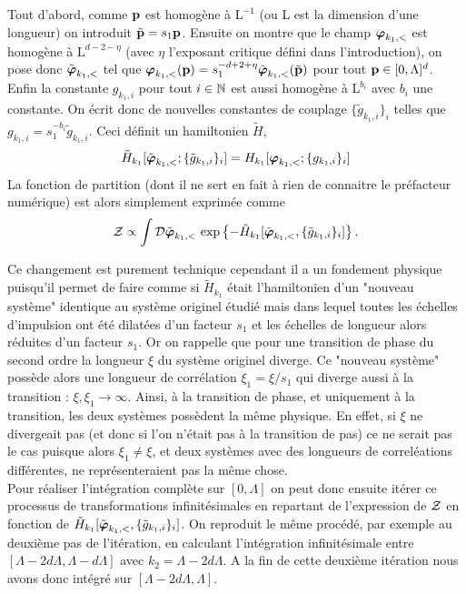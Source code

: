 \documentclass[10pt]{article}
\begin{document}
\begin{multicols}{2}
 Tout d'abord, comme ${\bf p}$ est homogène à $\text{L}^{-1}$ (ou L est la dimension d'une longueur) on introduit $\tilde{{\bf p}} = s_1 {\bf p}$. Ensuite on montre que le champ $\boldsymbol{ \varphi}_{k_1, <}$ est homogène à $\text{L}^{d-2-\eta}$ (avec $\eta$ l'exposant critique défini dans l'introduction), on pose donc $\tilde{\boldsymbol{ \varphi}}_{k_1, <}$ tel que $\boldsymbol{ \varphi}_{k_1, <}({\bf p}) = s_1^{-d+2+\eta} \tilde{\boldsymbol{ \varphi}}_{k_1, <}(\tilde{{\bf p}})$ pour tout ${\bf p} \in [0, \Lambda]^d$. Enfin la constante $g_{k_1, i}$ pour tout $i\in \mathbb{N}$ est aussi homogène à $\text{L}^{b_i}$ avec $b_i$ une constante. On écrit donc de nouvelles constantes de couplage $\{\tilde{g}_{k_1, i}\}_i$ telles que $g_{k_1, i} = s_1^{-b_i} \tilde{g}_{k_1, i}$. Ceci définit un hamiltonien $\tilde{H}$,
 \begin{equation}
 	\tilde{H}_{k_1}[\tilde{\boldsymbol{ \varphi}}_{k_1,<}; \{\tilde{g}_{k_1, i}\}_i ] = H_{k_1}[\boldsymbol{ \varphi}_{k_1,<}; \{g_{k_1,i}\}_i]
 \end{equation}
La fonction de partition (dont il ne sert en fait à rien de connaitre le préfacteur numérique) est alors simplement exprimée comme 
\begin{equation}
\mathcal{Z} \propto \int \mathcal{D} \tilde{\boldsymbol{ \varphi}}_{k_1,<} \, \exp\left\{- \tilde{H}_{k_1}[\tilde{\boldsymbol{ \varphi}}_{k_1,<}, \{\tilde{g}_{k_1, i}\}_i ] \right\}. 
\end{equation} 


Ce changement est purement technique cependant il a un fondement physique puisqu'il permet de faire comme si $\tilde{H}_{k_1}$ était l'hamiltonien d'un "nouveau système" identique au système originel étudié mais dans lequel toutes les échelles d'impulsion ont été dilatées d'un facteur $s_1$ et les échelles de longueur alors réduites d'un facteur $s_1$. Or on rappelle que pour une transition de phase du second ordre la longueur $\xi$ du système originel diverge. Ce "nouveau système" possède alors une longueur de corrélation $\xi_1 = \xi/s_1$ qui diverge aussi à la transition : $\xi, \xi_1 \to \infty$. Ainsi, à la transition de phase, et uniquement à la transition, les deux systèmes possèdent la même physique. En effet, si $\xi$ ne divergeait pas (et donc si l'on n'était pas à la transition de pas) ce ne serait pas le cas puisque alors $\xi_1 \neq \xi$, et deux systèmes avec des longueurs de correléations différentes, ne représenteraient pas la même chose. \\

 Pour réaliser l'intégration complète sur $[0, \Lambda]$ on peut donc ensuite itérer ce processus de transformations infinitésimales en repartant de l'expression de $\mathcal{Z}$ en fonction de $\tilde{H}_{k_1}[\tilde{\boldsymbol{ \varphi}}_{k_1,<}, \{\tilde{g}_{k_1, i}\}_i ]$. On reproduit le même procédé, par exemple au deuxième pas de l'itération, en calculant l'intégration infinitésimale entre $[\Lambda - 2d\Lambda, \Lambda - d\Lambda]$ avec $k_2 = \Lambda - 2d\Lambda$. A la fin de cette deuxième itération nous avons donc intégré sur $[\Lambda - 2d\Lambda, \Lambda]$.  \\
 

\end{multicols}
\end{document}
